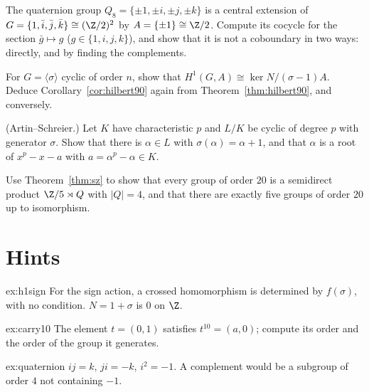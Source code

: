 \begin{exercise}[$\star\star$]\label{ex:quaternion}
The quaternion group $Q_8=\{\pm1,\pm i,\pm j,\pm k\}$ is a central extension of $G=\{1,\bar i,\bar j,\bar k\}\cong(\Z/2)^2$ by $A=\{\pm1\}\cong\Z/2$. Compute its cocycle for the section $\bar g\mapsto g$ ($g\in\{1,i,j,k\}$), and show that it
is not a coboundary in two ways: directly, and by finding the complements.
\end{exercise}

\begin{exercise}[$\star\star$]\label{ex:cyclich1}
For $G=\langle\sigma\rangle$ cyclic of order $n$, show that $H^1(G,A)\cong\ker N/(\sigma-1)A$. Deduce Corollary~\ref{cor:hilbert90} again from Theorem~\ref{thm:hilbert90}, and conversely.
\end{exercise}

\begin{exercise}[$\star\star$]\label{ex:artinschreier}
(Artin--Schreier.) Let $K$ have characteristic $p$ and $L/K$ be cyclic of degree $p$ with generator $\sigma$. Show that there is $\alpha\in L$ with $\sigma(\alpha)=\alpha+1$, and that $\alpha$ is a root of $x^p-x-a$ with $a=\alpha^p-\alpha\in K$.
\end{exercise}

\begin{exercise}[$\star\star\star$]\label{ex:order20}
Use Theorem~\ref{thm:sz} to show that every group of order $20$ is a semidirect product $\Z/5\rtimes Q$ with $|Q|=4$, and that there are exactly five groups of order $20$ up to isomorphism.
\end{exercise}

\section{Hints}

\begin{hint}{ex:h1sign}
For the sign action, a crossed homomorphism is determined by $f(\sigma)$, with no condition. $N=1+\sigma$ is $0$ on $\Z$.
\end{hint}

\begin{hint}{ex:carry10}
The element $t=(0,1)$ satisfies $t^{10}=(a,0)$; compute its order and the order of the group it generates.
\end{hint}

\begin{hint}{ex:quaternion}
$ij=k$, $ji=-k$, $i^2=-1$. A complement would be a subgroup of order $4$ not containing $-1$.
\end{hint}


